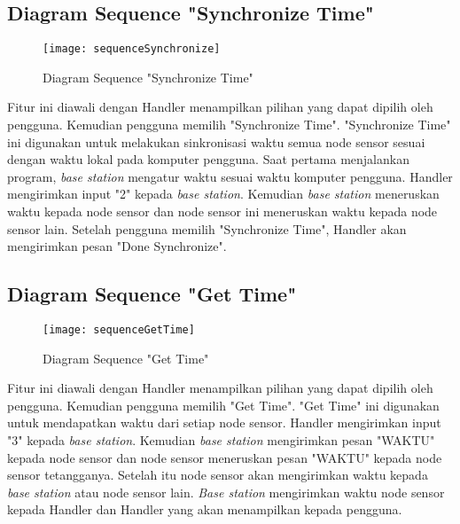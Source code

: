 \subsection{Diagram Sequence "Synchronize Time"}
\begin{figure}[H]
	\centering
	\texttt{[image: sequenceSynchronize]}
	\caption{Diagram Sequence "Synchronize Time"}
	\label{fig:sequenceSynchronize}
\end{figure}
Fitur ini diawali dengan Handler menampilkan pilihan yang dapat dipilih oleh pengguna. Kemudian pengguna memilih "Synchronize Time". "Synchronize Time" ini digunakan untuk melakukan sinkronisasi waktu semua node sensor sesuai dengan waktu lokal pada komputer pengguna. Saat pertama menjalankan program, \textit{base station} mengatur waktu sesuai waktu komputer pengguna. Handler mengirimkan input "2" kepada \textit{base station}. Kemudian \textit{base station} meneruskan waktu kepada node sensor dan node sensor ini meneruskan waktu kepada node sensor lain. Setelah pengguna memilih "Synchronize Time", Handler akan mengirimkan pesan "Done Synchronize".

\subsection{Diagram Sequence "Get Time"}
\begin{figure}[H]
	\centering
	\texttt{[image: sequenceGetTime]}
	\caption{Diagram Sequence "Get Time"}
	\label{fig:sequenceGetTime}
\end{figure}
Fitur ini diawali dengan Handler menampilkan pilihan yang dapat dipilih oleh pengguna. Kemudian pengguna memilih "Get Time". "Get Time" ini digunakan untuk mendapatkan waktu dari setiap node sensor. Handler mengirimkan input "3" kepada \textit{base station}. Kemudian \textit{base station} mengirimkan pesan "WAKTU" kepada node sensor dan node sensor meneruskan pesan "WAKTU" kepada node sensor tetangganya. Setelah itu node sensor akan mengirimkan waktu kepada \textit{base station} atau node sensor lain. \textit{Base station} mengirimkan waktu node sensor kepada Handler dan Handler yang akan menampilkan kepada pengguna.

